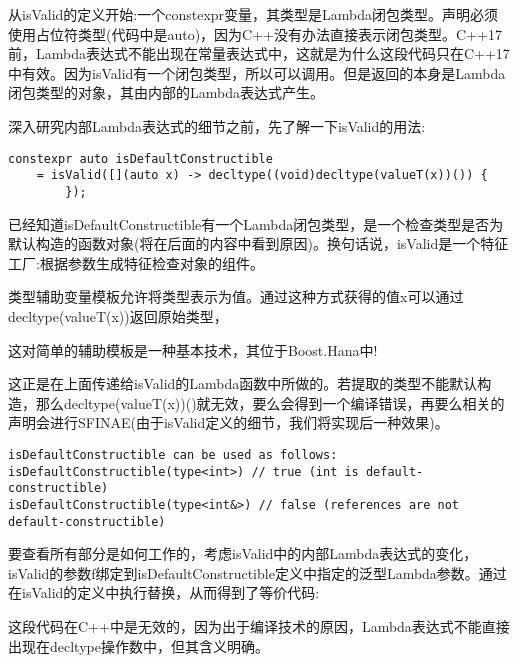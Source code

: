 从isValid的定义开始:一个constexpr变量，其类型是Lambda闭包类型。声明必须使用占位符类型(代码中是auto)，因为C++没有办法直接表示闭包类型。C++17前，Lambda表达式不能出现在常量表达式中，这就是为什么这段代码只在C++17中有效。因为isValid有一个闭包类型，所以可以调用。但是返回的本身是Lambda闭包类型的对象，其由内部的Lambda表达式产生。

深入研究内部Lambda表达式的细节之前，先了解一下isValid的用法:

\begin{lstlisting}[style=styleCXX]
constexpr auto isDefaultConstructible
	= isValid([](auto x) -> decltype((void)decltype(valueT(x))()) {
		});
\end{lstlisting}

已经知道isDefaultConstructible有一个Lambda闭包类型，是一个检查类型是否为默认构造的函数对象(将在后面的内容中看到原因)。换句话说，isValid是一个特征工厂:根据参数生成特征检查对象的组件。

类型辅助变量模板允许将类型表示为值。通过这种方式获得的值x可以通过decltype(valueT(x))返回原始类型，

\begin{tcolorbox}[colback=webgreen!5!white,colframe=webgreen!75!black]
\hspace*{0.75cm}这对简单的辅助模板是一种基本技术，其位于Boost.Hana中!
\end{tcolorbox}

这正是在上面传递给isValid的Lambda函数中所做的。若提取的类型不能默认构造，那么decltype(valueT(x))()就无效，要么会得到一个编译错误，再要么相关的声明会进行SFINAE(由于isValid定义的细节，我们将实现后一种效果)。

\begin{lstlisting}[style=styleCXX]
isDefaultConstructible can be used as follows:
isDefaultConstructible(type<int>) // true (int is default-constructible)
isDefaultConstructible(type<int&>) // false (references are not default-constructible)
\end{lstlisting}

要查看所有部分是如何工作的，考虑isValid中的内部Lambda表达式的变化，isValid的参数f绑定到isDefaultConstructible定义中指定的泛型Lambda参数。通过在isValid的定义中执行替换，从而得到了等价代码:

\begin{tcolorbox}[colback=webgreen!5!white,colframe=webgreen!75!black]
\hspace*{0.75cm}这段代码在C++中是无效的，因为出于编译技术的原因，Lambda表达式不能直接出现在decltype操作数中，但其含义明确。
\end{tcolorbox}

